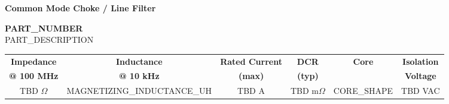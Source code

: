 \documentclass[10pt,a4paper]{article}
\begin{document}
\begin{center}
\colorbox{wurthred}{
\begin{minipage}{0.97\textwidth}
\centering
\color{white}
\vspace{2mm}
{\LARGE\bfseries Common Mode Choke / Line Filter}
\vspace{2mm}
\end{minipage}
}
\end{center}

\vspace{2mm}

\begin{center}
{\Huge\bfseries {{PART_NUMBER}}}\\[2mm]
{\large {{PART_DESCRIPTION}}}
\end{center}

\vspace{3mm}

\begin{center}
\begin{tabular}{|c|c|c|c|c|c|}
\hline
\rowcolor{tableheader}
\textbf{Impedance} & \textbf{Inductance} & \textbf{Rated Current} & \textbf{DCR} & \textbf{Core} & \textbf{Isolation} \\
\textbf{@ 100 MHz} & \textbf{@ 10 kHz} & \textbf{(max)} & \textbf{(typ)} & \textbf{} & \textbf{Voltage} \\
\hline
{\large TBD $\Omega$} & {\large {{MAGNETIZING_INDUCTANCE_UH}}} & {\large TBD A} & {\large TBD m$\Omega$} & {\large {{CORE_SHAPE}}} & {\large TBD VAC} \\
\hline
\end{tabular}
\end{center}

\vspace{4mm}
\end{document}
